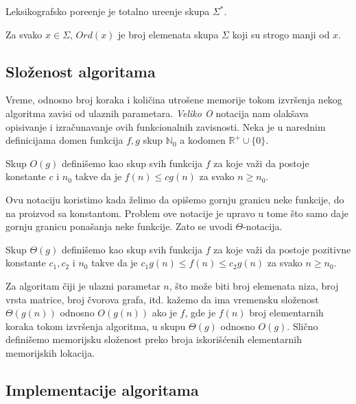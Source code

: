 \begin{thm}
Leksikografsko pore\dj enje je totalno ure\dj enje skupa $\Sigma^*$.
\end{thm}

\begin{dfn}
\label{orddef}
Za svako $x \in \Sigma$, $Ord(x)$ je broj elemenata skupa $\Sigma$ koji su strogo manji od $x$.
\end{dfn}
 
\subsection{Slo\v zenost algoritama}

Vreme, odnosno broj koraka i koli\v cina utro\v sene memorije tokom izvr\v senja nekog algoritma zavisi od ulaznih parametara. \textit{Veliko O} notacija nam olak\v sava opisivanje i izra\v cunavanje ovih funkcionalnih zavisnosti. Neka je u narednim definicijama domen funkcija $f, g$ skup $\mathbb{N}_0$ a kodomen $\mathbb{R}^{+} \cup \{ 0 \}$.

\begin{dfn}
Skup $O(g)$ defini\v semo kao skup svih funkcija $f$ za koje va\v zi da postoje konstante $c$ i $n_0$ takve da je $f(n) \leq c g(n)$ za svako $n \geq n_0$.
\end{dfn}

Ovu notaciju koristimo kada \v zelimo da opi\v semo gornju granicu neke funkcije, do na proizvod sa konstantom. Problem ove notacije je upravo u tome \v sto samo daje gornju granicu pona\v sanja neke funkcije. Zato se uvodi $\Theta$-notacija.

\begin{dfn}
Skup $\Theta(g)$ defini\v semo kao skup svih funkcija $f$ za koje va\v zi da postoje pozitivne konstante $c_1, c_2$ i $n_0$ takve da je $c_1 g(n) \leq f(n) \leq c_2 g(n)$ za svako $n \geq n_0$.
\end{dfn}

Za algoritam \v ciji je ulazni parametar $n$, \v sto mo\v ze biti broj elemenata niza, broj vrsta matrice, broj \v cvorova grafa, itd. ka\v zemo da ima vremensku slo\v zenost $\Theta(g(n))$ odnosno $O(g(n))$ ako je $f$, gde je $f(n)$ broj elementarnih koraka tokom izvr\v senja algoritma, u skupu $\Theta(g)$ odnosno $O(g)$. Sli\v cno defini\v semo memorijsku slo\v zenost preko broja iskori\v s\' cenih elementarnih memorijskih lokacija.

\subsection{Implementacije algoritama}
\label{konfiguracija}

